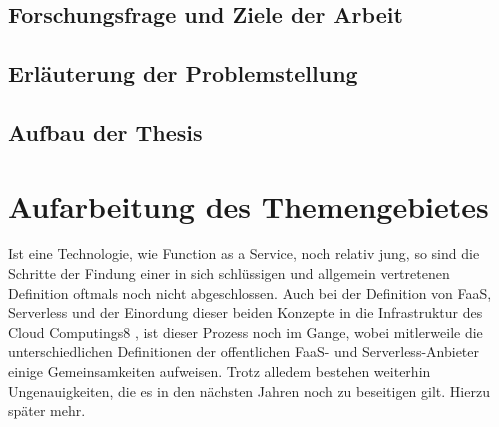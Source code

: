 \documentclass[11pt]{article}
\begin{document}
\subsection{Forschungsfrage und Ziele der Arbeit}
\subsection{Erläuterung der Problemstellung}
\subsection{Aufbau der Thesis}










\section{Aufarbeitung des Themengebietes}
Ist eine Technologie, wie Function as a Service, noch relativ jung, so sind die Schritte der Findung einer in sich schlüssigen und allgemein vertretenen Definition oftmals noch nicht abgeschlossen. Auch bei der Definition von FaaS, Serverless und der Einordung dieser beiden Konzepte in die Infrastruktur des Cloud Computings8  \cite{mell2011nist}, ist dieser Prozess noch im Gange, wobei mitlerweile die unterschiedlichen Definitionen der offentlichen FaaS- und Serverless-Anbieter einige Gemeinsamkeiten aufweisen. Trotz alledem bestehen weiterhin Ungenauigkeiten, die es in den nächsten Jahren noch zu beseitigen gilt. Hierzu später mehr. \\\\
\end{document}
